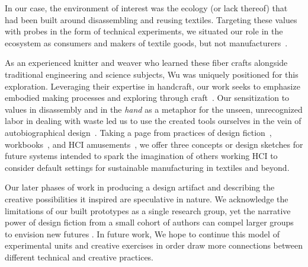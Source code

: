 \documentclass{sigchi}
\renewcommand\todo[1]{\emph{\color{red}[#1]}}
\begin{document}
In our case, the environment of interest was the ecology (or lack thereof) that had been built around disassembling and reusing textiles. Targeting these values with probes in the form of technical experiments, we situated our role in the ecosystem as consumers and makers of textile goods, but not manufacturers~\cite{gaver_design:_1999, gaver_what_2012}. 

As an experienced knitter and weaver who learned these fiber crafts alongside traditional engineering and science subjects, Wu was uniquely positioned for this exploration. Leveraging their expertise in handcraft, our work seeks to emphasize embodied making processes and exploring through craft~\cite{ingold_making:_2013}. Our sensitization to values in disassembly and in the \emph{hand} as a metaphor for the unseen, unrecognized labor in dealing with waste \cite{rifat_breaking_2019} led us to use the created tools ourselves in the vein of autobiographical design~\cite{neustaedter_autobiographical_2012, desjardins_living_2016, desjardins_revealing_2018}. Taking a page from practices of design fiction~\cite{kirsh_how_2011, blythe_pastiche_2004}, workbooks~\cite{gaver_making_2011}, and HCI amusements~\cite{devendorf_hci-amusement_2019}, we offer three concepts or design sketches for future systems intended to spark the imagination of others working HCI to consider default settings for sustainable manufacturing in textiles and beyond.

Our later phases of work in producing a design artifact and describing the creative possibilities it inspired are speculative in nature. We acknowledge the limitations of our built prototypes as a single research group, yet the narrative power of design fiction from a small cohort of authors can compel larger groups to envision new futures \cite{dunne_speculative_2013}. In future work, We hope to continue this model of experimental units and creative exercises in order draw more connections between different technical and creative practices.
\end{document}
